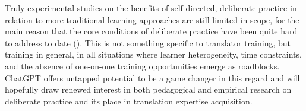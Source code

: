\documentclass[output=paper]{langscibook}
\begin{document}
Truly experimental studies on the benefits of self-directed, deliberate practice in relation to more traditional learning approaches are still limited in scope, for the main reason that the core conditions of deliberate practice have been quite hard to address to date (\citealt[8]{millerchow20}). This is not something specific to translator training, but training in general, in all situations where learner heterogeneity, time constraints, and the absence of one-on-one training opportunities emerge as roadblocks. ChatGPT offers untapped potential to be a game changer in this regard and will hopefully draw renewed interest in both pedagogical and empirical research on deliberate practice and its place in translation expertise acquisition.~


\sloppy\printbibliography[heading=subbibliography,notkeyword=this]
\end{document}
